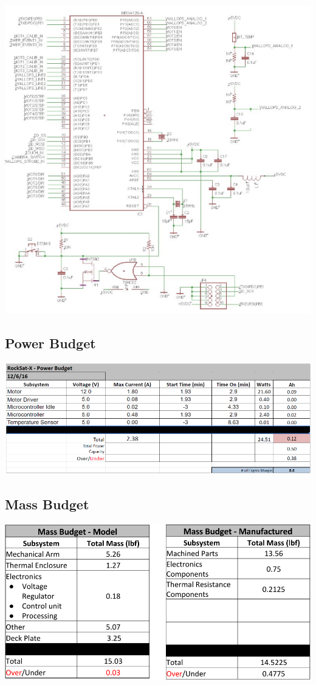\includegraphics[scale=.4]{./images/EESchems/AVR3}

\subsection{Power Budget}
\includegraphics[width=\textwidth]{./images/OtherDocs/powerBudget}

\subsection{Mass Budget}
\includegraphics[width=\textwidth]{./images/OtherDocs/massBudget}

